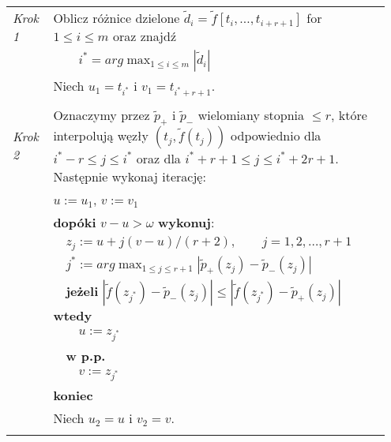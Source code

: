 \documentclass[oik, pdftex, robocza, man]{mgrwms}
\begin{document}
\noindent
\begin{tabular}{p{0.10\linewidth} p{0.85\linewidth}}
    
    \textit{Krok 1} & Oblicz różnice dzielone $\tilde{d}_i = \tilde{f}[t_i, \ldots, t_{i+r+1}]$ for $1 \leq i \leq m $ oraz znajdź \\
                    & \(\displaystyle \qquad i^* = arg \max_{1 \leq i \leq m }|\tilde{d}_i| \)  \\
                    & Niech $u_1 = t_{i^*}$ i $v_1 = t_{i^* + r + 1}$. \\
                    & \\

    \textit{Krok 2} & Oznaczymy przez $\tilde{p}_+$ i $\tilde{p}_-$ wielomiany stopnia $ \leq r$, które interpolują węzły $(t_j, \tilde{f}(t_j))$ odpowiednio dla $i^* - r \leq j \leq i^*$ oraz dla $i^* + r + 1 \leq j \leq i^* + 2r + 1$. Następnie wykonaj iterację: \\
                    & $u := u_1$, $v := v_1$ \\
                    & \textbf{dopóki} $v-u > \omega$ \textbf{wykonuj}: \\
                    & $\quad$$z_j := u + j(v-u) / (r+2), \qquad j = 1, 2, \ldots, r + 1$ \\
                    & $\quad$\(\displaystyle j^* := arg \max_{1 \leq j \leq r + 1}|\tilde{p}_{+}(z_j) - \tilde{p}_{-}(z_j)| \) \\
                    & $\quad$\textbf{jeżeli} $|\tilde{f}(z_{j^*}) - \tilde{p}_{-}(z_j)| \leq |\tilde{f}(z_{j^*}) - \tilde{p}_{+}(z_j)|$ \textbf{wtedy} \\
                    & $\quad\quad$$u:= z_{j^*}$ \\
                    & $\quad$\textbf{w p.p.} \\
                    & $\quad\quad$$v:= z_{j^*}$ \\
                    & \textbf{koniec} \\
                    & Niech $u_2 = u$ i $v_2 = v$. \\
                    & \\


\end{tabular}
\end{document}
